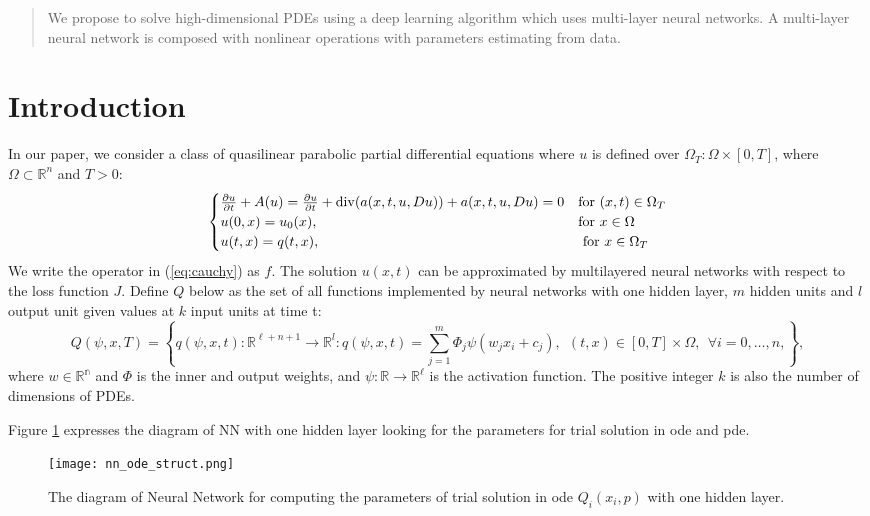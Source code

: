 \documentclass{article}
\begin{document}
	\tableofcontents
\begin{abstract}
	We propose to solve high-dimensional PDEs using a deep learning algorithm which uses multi-layer neural networks. A multi-layer neural network is composed with nonlinear operations with parameters estimating from data.
\end{abstract}
	\section{Introduction}

	In our paper, we consider a class of quasilinear parabolic partial differential equations where $u$ is defined over $\Omega_T:\Omega\times [0,T]$, where $\Omega\subset\mathbb{R}^n $ and $T>0$:
	\begin{equation}
	\begin{cases}
 \frac{\partial u}{\partial t} +A(u) =\frac{\partial u}{\partial t}+{\rm div}(a(x,t,u,Du))+a(x,t,u,Du)=0 & \text{for $(x,t) \in \Omega_{T}$}\\
u(0,x) = u_{0}(x), & \text{for $x \in \Omega$} \\
u(t,x) = q(t,x), & \text{ for $x \in \Omega_{T}$} \\
	\end{cases}
	\label{eq:cauchy}
	\end{equation}
	We write the operator in (\ref{eq:cauchy}) as $f$. The solution $u(x,t)$ can be approximated by multilayered neural networks with respect to the loss function $J$.
Define $Q$ below as the set of all functions implemented by neural networks with one hidden layer, $m$ hidden units and $\textit{l}$ output unit given values at $k$ input units at time t:
	\begin{equation}
	Q(\psi,x,T)=\left \lbrace q(\psi,x,t): \mathbb{R}^{\ell+n+1} \rightarrow \mathbb{R}^{\textit{l}}:
q(\psi,x,t) = \sum_{j=1}^{m}\Phi_{j}\psi(w_{j}x_{i} + c_j ),\  \ (t,x) \in [0,T]\times \Omega, \ \ \forall i = 0, \dots, n ,  \right\rbrace,
	\label{eq:nn}
	\end{equation}
	where $w\in\mathbb{R^n}$ and $\Phi$ is the inner and output weights,
and $\psi:\mathbb{R}\to\mathbb{R^\ell}$ is the activation function.
The positive integer $k$ is also the number of dimensions of PDEs.

Figure \ref{fig:nn_ode_struct} expresses the diagram of NN with one hidden layer looking for the parameters for trial solution in ode and pde. 
\begin{figure}[h]
	\centering
	\texttt{[image: nn\_ode\_struct.png]}
	\caption{The diagram of Neural Network for computing the parameters of trial solution in ode $Q_{i}(x_i,p)$ with one hidden layer. }
	\label{fig:nn_ode_struct}
\end{figure}
\end{document}
